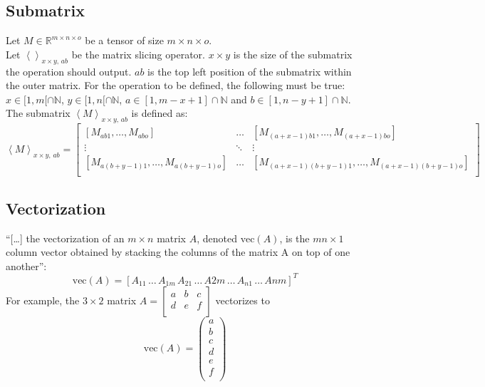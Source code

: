 \documentclass[12pt]{article}
\begin{document}
\subsection{Submatrix}
\label{sec:Ref:submatrix}
Let \(M \in\mathbb R^{m\times n\times o}\) be a tensor of size  \(m\times n\times o\).\\
Let \(\left<\right>_{x\times y,\,ab}\) be the matrix slicing operator. \(x\times y\) is the size of the submatrix the operation should output. \(ab\) is the top left position of the submatrix within the outer matrix.  For the operation to be defined, the following must be true: \(x \in [1, m[\cap\mathbb N\), \(y \in [1, n[ \cap\mathbb N\), \(a  \in [1, m-x+1]\cap\mathbb N\) and \(b \in [1, n-y+1]\cap\mathbb N\). The submatrix \(\left<M\right>_{x\times y,\,ab}\) is defined as:
\begin{equation}
\left<M\right>_{x\times y,\,ab} = 
\left[
\begin{matrix}
[M_{ab1},\dots,M_{abo}] & \dots & [M_{(a+x-1)b1},\dots,M_{(a+x-1)bo}]\\
\vdots &  \ddots & \vdots\\
[M_{a(b+y-1)1},\dots,M_{a(b+y-1)o}] & \dots & [M_{(a+x-1)(b+y-1)1},\dots, M_{(a+x-1)(b+y-1)o}]\\
\end{matrix}\right]
\end{equation}

\subsection{Vectorization}  \label{sec:ref:vectorization}
``[\dots] the vectorization of an \(m \times n\) matrix \(A\), denoted \(\text{vec}(A)\), is the \(mn \times 1\) column vector obtained by stacking the columns of the matrix A on top of one another''\cite{vectorization_2021}: 
\begin{equation}\label{eq:ref:vectorization}
\text{vec}(A) = \left[
A_{11}\,\dots\,A_{1m}\,A_{21}\,\dots \,A{2m}\,\dots\,A_{n1}\,\dots\,A{nm}
\right]^T
\end{equation}
For example, the \(3\times 2\) matrix \(A=\left[
\begin{matrix}
a & b & c\\
d & e & f\\
\end{matrix}
\right]\) vectorizes to
\[
\text{vec}(A) = \left(
\begin{matrix}
a\\
b\\
c\\
d\\
e\\
f\\
\end{matrix}
\right)
\]
\end{document}
